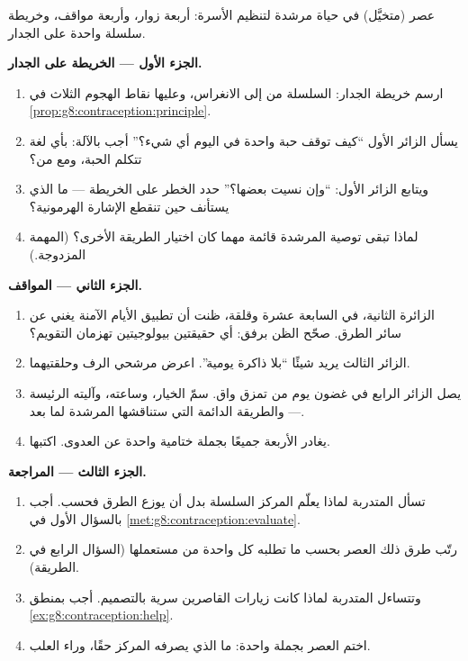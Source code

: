 \begin{problem}\label{pb:g8:contraception:1}
عصر (متخيَّل) في حياة مرشدة لتنظيم الأسرة: أربعة زوار،
وأربعة مواقف، وخريطة سلسلة واحدة على الجدار.

\medskip\noindent\textbf{الجزء الأول --- الخريطة على
الجدار.}
\begin{enumerate}
  \item ارسم خريطة الجدار: السلسلة من  إلى
        الانغراس، وعليها نقاط الهجوم الثلاث في
        \cref{prop:g8:contraception:principle}.
  \item يسأل الزائر الأول ``كيف توقف حبة واحدة في اليوم
        أي شيء؟'' أجب بالآلة: بأي لغة تتكلم الحبة، ومع
        من؟
  \item ويتابع الزائر الأول: ``وإن نسيت بعضها؟'' حدد
        الخطر على الخريطة --- ما الذي يستأنف حين تنقطع
        الإشارة الهرمونية؟
  \item لماذا تبقى توصية المرشدة  قائمة مهما كان
        اختيار الطريقة الأخرى؟ (المهمة المزدوجة.)
\end{enumerate}

\medskip\noindent\textbf{الجزء الثاني --- المواقف.}
\begin{enumerate}[resume]
  \item الزائرة الثانية، في السابعة عشرة وقلقة، ظنت أن
        تطبيق الأيام الآمنة يغني عن سائر الطرق. صحّح
        الظن برفق: أي حقيقتين بيولوجيتين تهزمان
        التقويم؟
  \item الزائر الثالث يريد شيئًا ``بلا ذاكرة يومية''.
        اعرض مرشحي الرف وحلقتيهما.
  \item يصل الزائر الرابع في غضون يوم من تمزق واق. سمّ
        الخيار، وساعته، وآليته الرئيسة --- والطريقة
        الدائمة التي ستناقشها المرشدة لما بعد.
  \item يغادر الأربعة جميعًا بجملة ختامية واحدة عن
        العدوى. اكتبها.
\end{enumerate}

\medskip\noindent\textbf{الجزء الثالث --- المراجعة.}
\begin{enumerate}[resume]
  \item تسأل المتدربة لماذا يعلّم المركز السلسلة بدل أن
        يوزع الطرق فحسب. أجب بالسؤال الأول في
        \cref{met:g8:contraception:evaluate}.
  \item رتّب طرق ذلك العصر بحسب ما تطلبه كل واحدة من
        مستعملها (السؤال الرابع في الطريقة).
  \item وتتساءل المتدربة لماذا كانت زيارات القاصرين سرية
        بالتصميم. أجب بمنطق
        \cref{ex:g8:contraception:help}.
  \item اختم العصر بجملة واحدة: ما الذي يصرفه المركز
        حقًا، وراء العلب.
\end{enumerate}
\end{problem}
